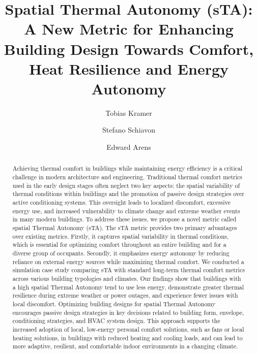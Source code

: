 
\begin{frontmatter}

\title{Spatial Thermal Autonomy (sTA): A New Metric for Enhancing Building Design Towards Comfort, Heat Resilience and Energy Autonomy}


\author[inst1]{Tobias Kramer}


\author[inst1]{Stefano Schiavon}

\author[inst1]{Edward Arens}






\begin{abstract}

Achieving thermal comfort in buildings while maintaining energy efficiency is a critical challenge in modern architecture and engineering. Traditional thermal comfort metrics used in the early design stages often neglect two key aspects: the spatial variability of thermal conditions within buildings and the promotion of passive design strategies over active conditioning systems. This oversight leads to localized discomfort, excessive energy use, and increased vulnerability to climate change and extreme weather events in many modern buildings.
To address these issues, we propose a novel metric called spatial Thermal Autonomy (sTA). The sTA metric provides two primary advantages over existing metrics. Firstly, it captures spatial variability in thermal conditions, which is essential for optimizing comfort throughout an entire building and for a diverse group of occupants. Secondly, it emphasizes energy autonomy by reducing reliance on external energy sources while maximizing thermal comfort.
We conducted a simulation case study comparing sTA with standard long-term thermal comfort metrics across various building typologies and climates. Our findings show that buildings with a high spatial Thermal Autonomy tend to use less energy, demonstrate greater thermal resilience during extreme weather or power outages, and experience fewer issues with local discomfort.
Optimizing building designs for spatial Thermal Autonomy encourages passive design strategies in key decisions related to building form, envelope, conditioning strategies, and HVAC system design. This approach supports the increased adoption of local, low-energy personal comfort solutions, such as fans or local heating solutions, in buildings with reduced heating and cooling loads, and can lead to more adaptive, resilient, and comfortable indoor environments in a changing climate.



\end{abstract}
\end{frontmatter}
